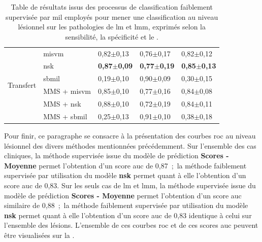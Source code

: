\begin{table}[H]
\begin{tabular}{cllll}
        \multirow{6}{*}{Transfert}   & \gls{misvm}              & 0,82$\pm$0,13             & 0,76$\pm$0,17             & 0,82$\pm$0,12             \\
                                     & \gls{nsk}                & \textbf{0,87$\pm$0,09}    & \textbf{0,77$\pm$0,19}    & \textbf{0,85$\pm$0,13}    \\
                                     & \gls{sbmil}              & 0,19$\pm$0,10             & 0,90$\pm$0,09             & 0,30$\pm$0,15             \\
                                     & MMS + \gls{misvm}        & 0,85$\pm$0,10             & 0,77$\pm$0,16             & 0,84$\pm$0,08             \\
                                     & MMS + \gls{nsk}          & 0,88$\pm$0,10             & 0,72$\pm$0,19             & 0,84$\pm$0,11             \\
                                     & MMS + \gls{sbmil}        & 0,25$\pm$0,13             & 0,91$\pm$0,10             & 0,38$\pm$0,18             \\ \bottomrule
    \end{tabular}
    \caption{Table de résultats issus des processus de classification faiblement supervisée par \gls{mil} employés pour mener une classification au niveau lésionnel sur les pathologies de \gls{lm} et \gls{lmm}, exprimés selon la sensibilité, la spécificité et le \fscore{}.}
    \label{tab:results_lesion_classification_weakly_patient_lm}
\end{table}

Pour finir, ce paragraphe se consacre à la présentation des courbes \gls{roc} au niveau lésionnel des divers méthodes mentionnées précédemment. Sur l'ensemble des cas cliniques, la méthode supervisée issue du modèle de prédiction \textbf{Scores - Moyenne} permet l'obtention d'un score \gls{auc} de 0,87~;~la méthode faiblement supervisée par utilisation du modèle \textbf{\gls{nsk}} permet quant à elle l'obtention d'un score \gls{auc} de 0,83. Sur les seuls cas de \gls{lm} et \gls{lmm}, la méthode supervisée issue du modèle de prédiction \textbf{Scores - Moyenne} permet l'obtention d'un score \gls{auc} similaire de 0,88~;~la méthode faiblement supervisée par utilisation du modèle \textbf{\gls{nsk}} permet quant à elle l'obtention d'un score \gls{auc} de 0,83 identique à celui sur l'ensemble des lésions. L'ensemble de ces courbes \gls{roc} et de ces scores \gls{auc} peuvent être visualisées sur la .\par

